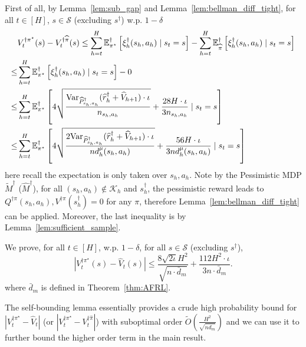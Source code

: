 	First of all, by Lemma~\ref{lem:sub_gap} and Lemma~\ref{lem:bellman_diff_tight}, for all $t\in[H]$, $s\in\mathcal{S}$ (excluding $s^\dagger$) w.p. $1-\delta$
	\begin{equation}\label{eqn:expression_bound}
	\begin{aligned}
&V_t^{\dagger\pi^\star}(s)-V_t^{\dagger\widehat{\pi}}(s)\leq \sum_{h=t}^H\mathbb{E}^\dagger_{\pi^\star}\left[\xi^\dagger_h(s_h,a_h)\mid s_t=s\right]-\sum_{h=t}^H\mathbb{E}^\dagger_{\widehat{\pi}}\left[\xi^\dagger_h(s_h,a_h)\mid s_t=s\right]\\
\leq&\sum_{h=t}^H\mathbb{E}^\dagger_{\pi^\star}\left[\xi^\dagger_h(s_h,a_h)\mid s_t=s\right]-0\\
\leq&\sum_{h=t}^H\mathbb{E}^\dagger_{\pi^\star}\left[4\sqrt{\frac{\mathrm{Var}_{\widehat{P}^\dagger_{s_h,a_h}}(\widehat{r}^\dagger_h+\widehat{V}_{h+1})\cdot\iota}{n_{s_h,a_h}}}+\frac{28H\cdot\iota}{3n_{s_h,a_h}}\mid s_t=s\right]\\
\leq&\sum_{h=t}^H\mathbb{E}^\dagger_{\pi^\star}\left[4\sqrt{\frac{2\mathrm{Var}_{\widehat{P}^\dagger_{s_h,a_h}}(\widehat{r}^\dagger_h+\widehat{V}_{h+1})\cdot\iota}{nd^\mu_h(s_h,a_h)}}+\frac{56H\cdot\iota}{3nd^\mu_h(s_h,a_h)}\mid s_t=s\right]\\
	\end{aligned}
	\end{equation}
	here recall the expectation is only taken over $s_h,a_h$. Note by the Pessimistic MDP $\widetilde{M}^\dagger$ ($\widehat{M}^\dagger$), for all $(s_h,a_h)\notin \mathcal{K}_h$ and $s^\dagger_h$, the pessimistic reward leads to $Q^{\dagger\pi}(s_h,a_h),V^{\dagger\pi}(s^\dagger_h)=0$ for any $\pi$, therefore Lemma~\ref{lem:bellman_diff_tight} can be applied. Moreover, the last inequality is by Lemma~\ref{lem:sufficient_sample}.
	
	
	\begin{lemma}\label{lem:self_bound}
	 We prove, for all $t\in[H]$, w.p. $1-\delta$, for all $s\in\mathcal{S}$ (excluding $s^\dagger$),
	\[
	\left|V_t^{\dagger\pi^\star}(s)-\widehat{V}_t(s)\right|\leq \frac{8\sqrt{2\iota}H^2}{\sqrt{n\cdot\bar{d}_m}} +\frac{112H^2\cdot \iota}{3n\cdot \bar{d}_m}.
	\]
	where $\bar{d}_m$ is defined in Theorem~\ref{thm:AFRL}.
	\end{lemma}


	\begin{remark}
		The self-bounding lemma essentially provides a crude high probability bound for $|V_t^{\dagger\pi^\star}-\widehat{V}_t|$ (or $|V_t^{\dagger\pi^\star}-V_t^{\dagger\widehat{\pi}}|$) with suboptimal order $\widetilde{O}(\frac{H^2}{\sqrt{n\bar{d}_m}})$ and we can use it to further bound the higher order term in the main result.
	\end{remark}


